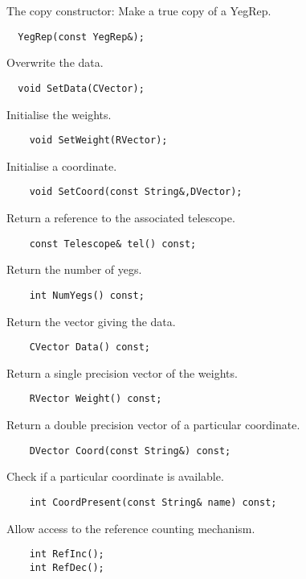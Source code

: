    The copy constructor: Make a true copy of a YegRep.
\begin{verbatim}
  YegRep(const YegRep&);
\end{verbatim}

   Overwrite the data.
\begin{verbatim}
  void SetData(CVector);
\end{verbatim}

    Initialise the weights.
\begin{verbatim}
    void SetWeight(RVector);
\end{verbatim}

    Initialise a coordinate.
\begin{verbatim}
    void SetCoord(const String&,DVector);
\end{verbatim}

    Return a reference to the associated telescope.
\begin{verbatim}
    const Telescope& tel() const;
\end{verbatim}
  
   Return the number of yegs.
\begin{verbatim}
    int NumYegs() const;
\end{verbatim}
  
    Return the vector giving the data.
\begin{verbatim}
    CVector Data() const;
\end{verbatim}

   Return a single precision vector of the weights.
\begin{verbatim}
    RVector Weight() const;
\end{verbatim}

   Return a double precision vector of a particular coordinate.
\begin{verbatim}
    DVector Coord(const String&) const;
\end{verbatim}
  
   Check if a particular coordinate is available.
\begin{verbatim}
    int CoordPresent(const String& name) const;
\end{verbatim}
  
   Allow access to the reference counting mechanism.
\begin{verbatim}
    int RefInc();
    int RefDec();
\end{verbatim}
